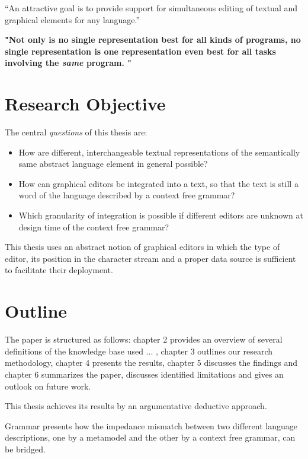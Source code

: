 
``An attractive goal is to provide support for simultaneous editing of textual and graphical elements for any language.''\cite{EMP}


\textbf{
"Not only is no single representation best for all kinds of programs, no single representation is one representation even best for all tasks involving the \emph{same}  program. " \cite{Petri} }



\section{Research Objective}
The central \emph{questions} of this thesis are:
\begin{itemize}
	\item How are different, interchangeable textual representations of the semantically same abstract language element in general possible?
	\item How can graphical editors be integrated into a text, so that the text is still a word of the language described by a context free grammar?
	\item Which granularity of integration is possible if different editors are unknown at design time of the context free grammar?
\end{itemize}

This thesis uses an abstract notion of graphical editors in which the type of editor, its position in the character stream and a proper data source is sufficient to facilitate their deployment.




\section{Outline}
The paper is structured as follows: chapter 2 provides an overview of several definitions of the knowledge base used ... , chapter 3 outlines our research methodology, chapter 4 presents the results, chapter 5 discusses the findings and chapter 6 summarizes the paper, discusses identified limitations and gives an outlook on future work.

This thesis achieves its results by an argumentative deductive approach. 

Grammar presents how the impedance mismatch between two different language descriptions, one by a metamodel and the other by a context free grammar, can be bridged. 

